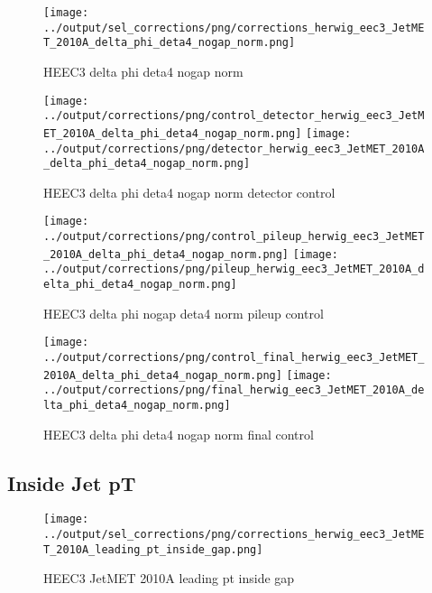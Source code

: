 \documentclass[11pt]{book}
\begin{document}
\begin{figure}[ht]
\centering
\texttt{[image: ../output/sel\_corrections/png/corrections\_herwig\_eec3\_JetMET\_2010A\_delta\_phi\_deta4\_nogap\_norm.png]}
\caption{HEEC3 delta phi deta4 nogap norm}
\label{fig:HEEC3_JetMET_2010A_delta_phi_deta4_nogap_norm}
\end{figure}

\begin{figure}[ht]
\centering
\texttt{[image: ../output/corrections/png/control\_detector\_herwig\_eec3\_JetMET\_2010A\_delta\_phi\_deta4\_nogap\_norm.png]}
\texttt{[image: ../output/corrections/png/detector\_herwig\_eec3\_JetMET\_2010A\_delta\_phi\_deta4\_nogap\_norm.png]}
\caption{HEEC3 delta phi deta4 nogap norm detector control}
\label{fig:HEEC3_JetMET_2010A_delta_phi_deta4_nogap_norm_detector_control}
\end{figure}

\begin{figure}[ht]
\centering
\texttt{[image: ../output/corrections/png/control\_pileup\_herwig\_eec3\_JetMET\_2010A\_delta\_phi\_deta4\_nogap\_norm.png]}
\texttt{[image: ../output/corrections/png/pileup\_herwig\_eec3\_JetMET\_2010A\_delta\_phi\_deta4\_nogap\_norm.png]}
\caption{HEEC3 delta phi nogap deta4 norm pileup control}
\label{fig:HEEC3_JetMET_2010A_delta_phi_deta4_nogap_norm_pileup_control}
\end{figure}


\begin{figure}[ht]
\centering
\texttt{[image: ../output/corrections/png/control\_final\_herwig\_eec3\_JetMET\_2010A\_delta\_phi\_deta4\_nogap\_norm.png]}
\texttt{[image: ../output/corrections/png/final\_herwig\_eec3\_JetMET\_2010A\_delta\_phi\_deta4\_nogap\_norm.png]}
\caption{HEEC3 delta phi deta4 nogap norm final control}
\label{fig:HEEC3_JetMET_2010A_delta_phi_deta4_nogap_norm_final_control}
\end{figure}

\clearpage
\subsection{Inside Jet pT}
\begin{figure}[ht]
\centering
\texttt{[image: ../output/sel\_corrections/png/corrections\_herwig\_eec3\_JetMET\_2010A\_leading\_pt\_inside\_gap.png]}
\caption{HEEC3 JetMET 2010A leading pt inside gap}
\label{fig:HEEC3_JetMET_2010A_leading_pt_inside_gap}
\end{figure}
\end{document}
